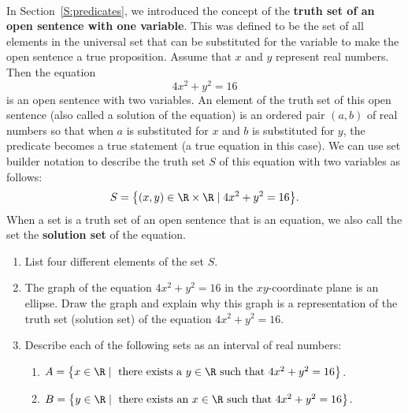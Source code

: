 \begin{previewactivity} \label{PA:eqn2variables} \hfill \\
In Section~\ref{S:predicates}, we introduced the concept of the \textbf{truth set of an open sentence with one variable}.
%
  This was defined to be the set of all elements in the universal set that can be substituted for the variable to make the open sentence a true proposition.  Assume that  $x$  and  $y$  represent real numbers.  Then the equation
\[
4x^2  + y^2  = 16
\]
is an open sentence with two variables.  An element of the truth set of this open sentence (also called a solution of the equation) is an ordered pair  $\left( {a, b} \right)$ of real numbers so that when  $a$  is substituted for  $x$  and  $b$  is substituted for  $y$, the predicate becomes a true statement (a true equation in this case).  We can use set builder notation to describe the truth set $S$ of this equation with two variables as follows:
\[
S = \left\{ (x, y) \in \R \times \R \mid 4x^2 + y^2 = 16 \right\}\!.
\]
When a set is a truth set of an open sentence that is an equation, we also call the set the 
\textbf{solution set}
%
 of the equation.
\begin{enumerate}
\item List four different elements of the set $S$\!.

\item The graph of the equation  $4x^2  + y^2  = 16$  in the $xy$-coordinate plane is an ellipse.  Draw the graph and explain why this graph is a representation of the truth set (solution set) of the equation $4x^2 + y^2 = 16$.


\item Describe each of the following sets as an interval of real numbers:
\label{PA:eqn2variables3}
\begin{enumerate}
\item $A = \left\{ x \in \R \mid \text{ there exists a } y \in \R \text{ such that } 4x^2 + y^2 = 16 \right\}$.

\item $B = \left\{ y \in \R \mid \text{ there exists an } x \in \R \text{ such that } 4x^2 + y^2 = 16 \right\}$.
\end{enumerate}

\end{enumerate}
\end{previewactivity}
\hbreak
%

